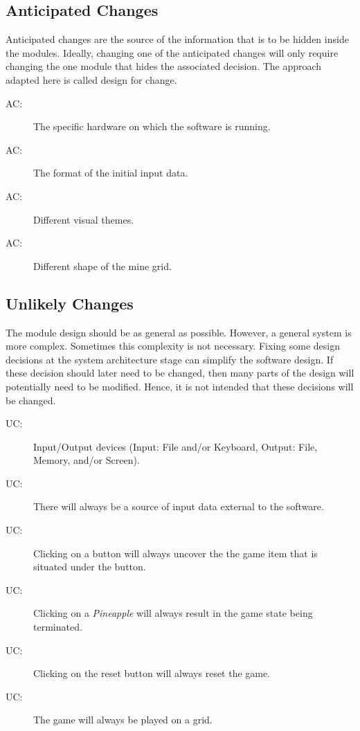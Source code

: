 \documentclass[12pt, titlepage]{article}
\newcounter{acnum}
\newcommand{\actheacnum}{AC\theacnum}
\newcounter{ucnum}
\newcommand{\uctheucnum}{UC\theucnum}
\begin{document}
\subsection{Anticipated Changes} \label{SecAchange}
Anticipated changes are the source of the information that is to be hidden
inside the modules. Ideally, changing one of the anticipated changes will only
require changing the one module that hides the associated decision. The approach
adapted here is called design for change.

\begin{description}
\item[ \actheacnum \label{acHardware}:] The specific
  hardware on which the software is running.
\item[ \actheacnum \label{acInput}:] The format of the
  initial input data.
\item[ \actheacnum \label{acThemes}:] Different
  visual themes.
\item[ \actheacnum \label{acShapes}:] Different
  shape of the mine grid.
\end{description}

\subsection{Unlikely Changes} \label{SecUchange}
The module design should be as general as possible. However, a general system is
more complex. Sometimes this complexity is not necessary. Fixing some design
decisions at the system architecture stage can simplify the software design. If
these decision should later need to be changed, then many parts of the design
will potentially need to be modified. Hence, it is not intended that these
decisions will be changed.

\begin{description}
\item[ \uctheucnum \label{ucIO}:] Input/Output devices
  (Input: File and/or Keyboard, Output: File, Memory, and/or Screen).
\item[ \uctheucnum \label{ucInput}:] There will always be
  a source of input data external to the software.
\item[ \uctheucnum \label{ucButton}:] Clicking on a button
  will always uncover the the game item that is situated under the button.
\item[ \uctheucnum \label{ucTermination}:] Clicking on a
  \textit{Pineapple} will always result in the game state being terminated.
\item[ \uctheucnum \label{ucReset}:] Clicking on the
  reset button will always reset the game.
\item[ \uctheucnum \label{ucGrid}:] The game will always
  be played on a grid.
\end{description}
\end{document}
